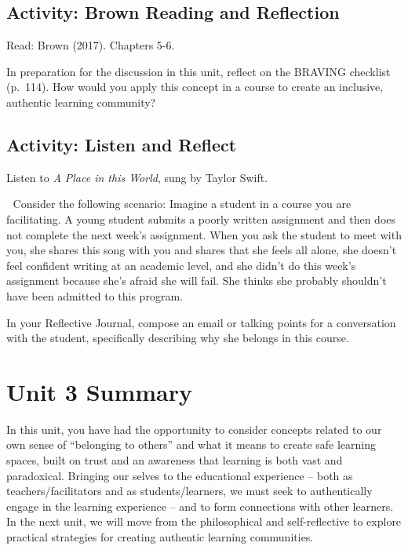 \documentclass[
]{book}
\begin{document}
\hypertarget{activity-brown-reading-and-reflection-1}{%
\subsection{Activity: Brown Reading and Reflection}\label{activity-brown-reading-and-reflection-1}}

\begin{reflect}
Read: Brown (2017). Chapters 5-6.

In preparation for the discussion in this unit, reflect on the BRAVING
checklist (p.~114). How would you apply this concept in a course to
create an inclusive, authentic learning community?
\end{reflect}

\hypertarget{activity-listen-and-reflect-1}{%
\subsection{Activity: Listen and Reflect}\label{activity-listen-and-reflect-1}}

\begin{video}
Listen to \emph{A Place in this World}, sung by Taylor Swift.

💭 Consider the following scenario: Imagine a student in a course you are
facilitating. A young student submits a poorly written assignment and
then does not complete the next week's assignment. When you ask the
student to meet with you, she shares this song with you and shares that
she feels all alone, she doesn't feel confident writing at an academic
level, and she didn't do this week's assignment because she's afraid she
will fail. She thinks she probably shouldn't have been admitted to this
program.

In your Reflective Journal, compose an email or talking points for a
conversation with the student, specifically describing why she belongs
in this course.
\end{video}

\hypertarget{unit-3-summary}{%
\section*{Unit 3 Summary}\label{unit-3-summary}}

In this unit, you have had the opportunity to consider concepts related to our own sense of ``belonging to others'' and what it means to create safe learning spaces, built on trust and an awareness that learning is both vast and paradoxical. Bringing our selves to the educational experience -- both as teachers/facilitators and as students/learners, we must seek to authentically engage in the learning experience -- and to form connections with other learners. In the next unit, we will move from the philosophical and self-reflective to explore practical strategies for creating authentic learning communities.
\end{document}
